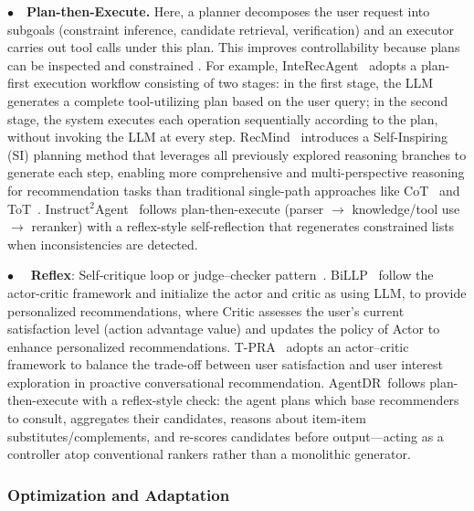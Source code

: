 \noindent$\bullet\quad$\textbf{Plan-then-Execute.}
{Here, a planner decomposes the user request into subgoals (\eg constraint inference, candidate retrieval, verification) and an executor carries out tool calls under this plan. This improves controllability because plans can be inspected and constrained \cite{huang2024interecagent,yu2025thought}.} 
For example, InteRecAgent~\cite{huang2024interecagent} adopts a plan-first execution workflow consisting of two stages: in the first stage, the LLM generates a complete tool-utilizing plan based on the user query; in the second stage, the system executes each operation sequentially according to the plan, without invoking the LLM at every step. 
RecMind~\cite{wang2024recmind} introduces a Self-Inspiring (SI) planning method that leverages all previously explored reasoning branches to generate each step, enabling more comprehensive and multi-perspective reasoning for recommendation tasks than traditional single-path approaches like CoT~\cite{wei2022cot} and ToT~\cite{yao2023tot}. 
Instruct$^2$Agent~\cite{xu2025iagent} follows plan-then-execute (parser $\rightarrow$ knowledge/tool use $\rightarrow$ reranker) with a reflex-style self-reflection that regenerates constrained lists when inconsistencies are detected.



\noindent$\bullet\quad${
\textbf{Reflex}: Self‑critique loop or judge–checker pattern~\cite{wu2025starec,wu2025personalized}.
BiLLP~\citet{shi2024planner}  
follow the actor-critic framework and initialize the actor and critic as using LLM, 
to provide personalized recommendations, where Critic assesses the user’s
current satisfaction level (action advantage value) and updates
the policy of Actor to enhance personalized recommendations.
T-PRA~\cite{wang2025t-pra} adopts an actor–critic framework to balance the trade-off between user satisfaction and user
interest exploration in proactive conversational recommendation.
AgentDR~\cite{yang2025agentdr}follows plan-then-execute with a reflex-style check: the agent plans which base recommenders to consult, aggregates their candidates, reasons about item-item substitutes/complements, and re-scores candidates before output—acting as a controller atop conventional rankers rather than a monolithic generator.
}



\subsubsection{\textbf{Optimization and Adaptation}}\label{subsubsec:agent_rec_optimization}



